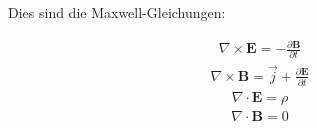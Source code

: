\documentclass[fleqn]{scrartcl}
\begin{document}
Dies sind die Maxwell-Gleichungen:

\begin{align}
\nabla \times \boldsymbol{E} = -\frac{\partial  \boldsymbol{B}}{\partial t}
\end{align}
\begin{align}
\nabla \times \boldsymbol{B} = \vec{j} + \frac{\partial  \boldsymbol{E}}{\partial t}
\end{align}
\begin{align}
\nabla \cdot \boldsymbol{E} = \rho
\end{align}
\begin{align}
\nabla \cdot \boldsymbol{B} = 0
\end{align}
\end{document}
